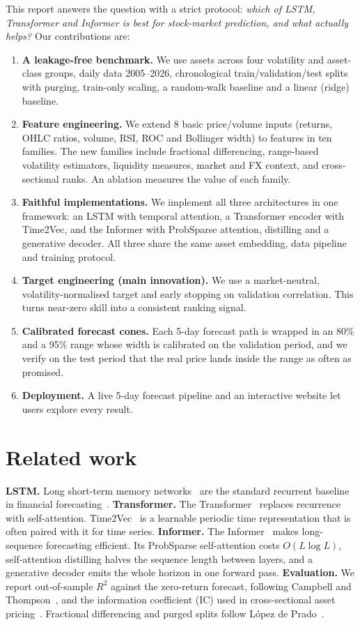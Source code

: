\documentclass[11pt,a4paper]{article}
\begin{document}
This report answers the question with a strict protocol: \emph{which of LSTM, Transformer and Informer is best for stock-market prediction, and
what actually helps?} Our contributions are:
\begin{enumerate}
  \item \textbf{A leakage-free benchmark.} We use \NAssets{} assets across four volatility and asset-class groups, daily data 2005--2026,
  chronological train/validation/test splits with purging, train-only scaling, a random-walk baseline and a linear (ridge) baseline.
  \item \textbf{Feature engineering.} We extend 8 basic price/volume inputs (returns, OHLC ratios, volume, RSI, ROC and Bollinger width) to \NFeat{} features in ten families.
  The new families include fractional differencing, range-based volatility estimators, liquidity measures, market and FX context, and cross-sectional ranks.
  An ablation measures the value of each family.
  \item \textbf{Faithful implementations.} We implement all three architectures in one framework: an LSTM with temporal attention,
  a Transformer encoder with Time2Vec, and the Informer with ProbSparse attention, distilling and a generative decoder.
  All three share the same asset embedding, data pipeline and training protocol.
  \item \textbf{Target engineering (main innovation).} We use a market-neutral, volatility-normalised target and early stopping on validation
  correlation. This turns near-zero skill into a consistent ranking signal.
  \item \textbf{Calibrated forecast cones.} Each 5-day forecast path is wrapped in an 80\% and a 95\% range whose width is calibrated on the
  validation period, and we verify on the test period that the real price lands inside the range as often as promised.
  \item \textbf{Deployment.} A live 5-day forecast pipeline and an interactive website let users explore every result.
\end{enumerate}

\section{Related work}
\textbf{LSTM.} Long short-term memory networks~\cite{hochreiter1997} are the standard recurrent baseline in financial forecasting~\cite{fischer2018}.
\textbf{Transformer.} The Transformer~\cite{vaswani2017} replaces recurrence with self-attention. Time2Vec~\cite{kazemi2019} is a learnable
periodic time representation that is often paired with it for time series.
\textbf{Informer.} The Informer~\cite{zhou2021} makes long-sequence forecasting efficient. Its ProbSparse self-attention costs $O(L\log L)$,
self-attention distilling halves the sequence length between layers, and a generative decoder emits the whole horizon in one forward pass.
\textbf{Evaluation.} We report out-of-sample $R^2$ against the zero-return forecast, following Campbell and Thompson~\cite{campbell2008},
and the information coefficient (IC) used in cross-sectional asset pricing~\cite{gu2020}.
Fractional differencing and purged splits follow L\'opez de Prado~\cite{lopezdeprado2018}.
\end{document}
